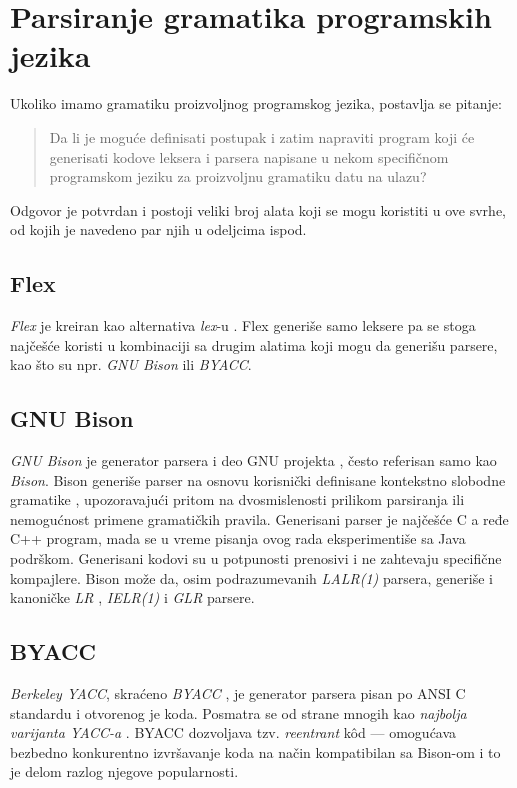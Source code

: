 \section{Parsiranje gramatika programskih jezika}
\label{sec:ParsingGrammars}

Ukoliko imamo gramatiku proizvoljnog programskog jezika, postavlja se pitanje: 
\begin{quote}
    Da li je moguće definisati postupak i zatim napraviti program koji će generisati kodove leksera i parsera napisane u nekom specifičnom programskom jeziku za proizvoljnu gramatiku datu na ulazu?
\end{quote}
Odgovor je potvrdan i postoji veliki broj alata koji se mogu koristiti u ove svrhe, od kojih je navedeno par njih u odeljcima ispod.

\subsection{Flex}
\label{subsec:Flex}
\emph{Flex} \cite{Flex} je kreiran kao alternativa \emph{lex}-u \cite{LexYacc}. Flex generiše samo leksere pa se stoga najčešće koristi u kombinaciji sa drugim alatima koji mogu da generišu parsere, kao što su npr. \emph{GNU Bison} ili \emph{BYACC}.

\subsection{GNU Bison}
\label{subsec:GNUBison}
\emph{GNU Bison} \cite{GNUBison} je generator parsera i deo GNU projekta \cite{GNUProject}, često referisan samo kao \emph{Bison}. Bison generiše parser na osnovu korisnički definisane kontekstno slobodne gramatike \cite{ContextFreeGrammars}, upozoravajući pritom na dvosmislenosti prilikom parsiranja ili nemogućnost primene gramatičkih pravila. Generisani parser je najčešće C a ređe C++ program, mada se u vreme pisanja ovog rada eksperimentiše sa Java podrškom. Generisani kodovi su u potpunosti prenosivi i ne zahtevaju specifične kompajlere. Bison može da, osim podrazumevanih \emph{LALR(1)} \cite{LALR1} parsera, generiše i kanoničke \emph{LR} \cite{LR}, \emph{IELR(1)} \cite{IELR1} i \emph{GLR} \cite{GLR} parsere.

\subsection{BYACC}
\label{subsec:BYACC}
\emph{Berkeley YACC}, skraćeno \emph{BYACC} \cite{BYACC}, je generator parsera pisan po ANSI C standardu i otvorenog je koda. Posmatra se od strane mnogih kao \textit{najbolja varijanta YACC-a} \cite{LexYacc}. BYACC dozvoljava tzv. \emph{reentrant} k\^od --- omogućava bezbedno konkurentno izvršavanje koda na način kompatibilan sa Bison-om i to je delom razlog njegove popularnosti.

